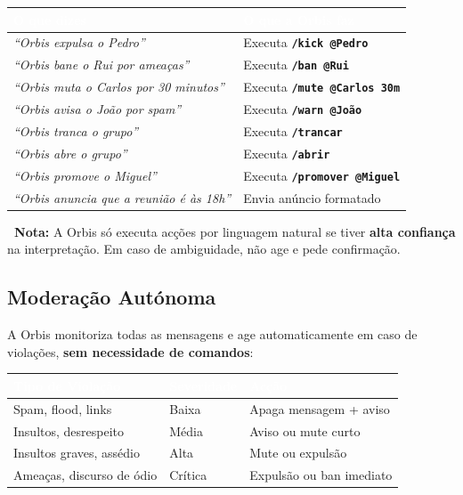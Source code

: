 \documentclass[12pt,a4paper]{article}
\newcommand{\cmd}[1]{\texttt{\textcolor{orbisblue}{\textbf{#1}}}}
\begin{document}
\begin{center}
\begin{tabular}{L{6.5cm} L{6.5cm}}
\toprule
{}\textcolor{white}{\textbf{O que dizes}} & \textcolor{white}{\textbf{O que a Orbis faz}} \\
\midrule
\textit{``Orbis expulsa o Pedro''} & Executa \cmd{/kick @Pedro} \\
\textit{``Orbis bane o Rui por ameaças''} & Executa \cmd{/ban @Rui} \\
\textit{``Orbis muta o Carlos por 30 minutos''} & Executa \cmd{/mute @Carlos 30m} \\
\textit{``Orbis avisa o João por spam''} & Executa \cmd{/warn @João} \\
\textit{``Orbis tranca o grupo''} & Executa \cmd{/trancar} \\
\textit{``Orbis abre o grupo''} & Executa \cmd{/abrir} \\
\textit{``Orbis promove o Miguel''} & Executa \cmd{/promover @Miguel} \\
\textit{``Orbis anuncia que a reunião é às 18h''} & Envia anúncio formatado \\
\bottomrule
\end{tabular}
\end{center}

\begin{tcolorbox}[warnbox]
\textbf{\textcolor{orbisYellow}{\faExclamationTriangle\ Nota:}} A Orbis só executa acções por linguagem natural se tiver \textbf{alta confiança} na interpretação. Em caso de ambiguidade, não age e pede confirmação.
\end{tcolorbox}

\subsection{Moderação Autónoma}

A Orbis monitoriza todas as mensagens e age automaticamente em caso de violações, \textbf{sem necessidade de comandos}:

\begin{center}
\begin{tabular}{L{3.5cm} C{2.5cm} L{6.5cm}}
\toprule
{}\textcolor{white}{\textbf{Tipo de Violação}} & \textcolor{white}{\textbf{Severidade}} & \textcolor{white}{\textbf{Acção}} \\
\midrule
Spam, flood, links & Baixa & Apaga mensagem + aviso \\
Insultos, desrespeito & Média & Aviso ou mute curto \\
Insultos graves, assédio & Alta & Mute ou expulsão \\
Ameaças, discurso de ódio & Crítica & Expulsão ou ban imediato \\
\bottomrule
\end{tabular}
\end{center}
\end{document}
